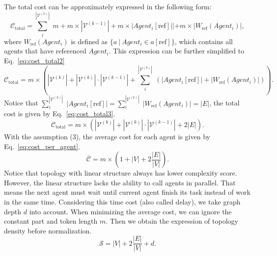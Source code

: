 \documentclass{article}
\theoremstyle{definition}
\begin{document}
The total cost can be approximately expressed in the following form:
\begin{equation}\label{eq:cost_total}
\mathcal{C}_{\text{total}} = \sum_{i}^{|\mathcal{V}^{(k)}|} \; m + m \times |\mathcal{V}^{(k-1)}| + m \times |Agent_i[\text{ref}]|| + m \times |W_{\text{ref}}(Agent_i)|,
\end{equation}
where $W_{\text{ref}}(Agent_i)$ is defined as $\{ a\ |\ Agent_i \in a[\text{ref}] \}$, which contains all agents that have referenced $Agent_i$. This expression can be further simplified to Eq.~\ref{eq:cost_total2}
\begin{equation}\label{eq:cost_total2}
\mathcal{C}_{\text{total}} = m \times (|\mathcal{V}^{(k)}| + |\mathcal{V}^{(k)}| \cdot |\mathcal{V}^{(k-1)}| + \sum^{|\mathcal{V}^{(k)}|}_i\;(|Agent_i[\text{ref}]| + |W_{\text{ref}}(Agent_i)|)).
\end{equation}
Notice that \(\sum^{|\mathcal{V}^{(k)}|}_i\;|Agent_i[\text{ref}]| =\sum^{|\mathcal{V}^{(k)}|}_i\;|W_{\text{ref}}(Agent_i)|=|E|\), the total cost is given by Eq.~\ref{eq:cost_total3}.
\begin{equation}\label{eq:cost_total3}
\mathcal{C}_{\text{total}} = m \times (|\mathcal{V}^{(k)}| + |\mathcal{V}^{(k)}| \cdot |\mathcal{V}^{(k-1)}| + 2|E|).
\end{equation}
With the assumption (3), the average cost for each agent is given by Eq.~\ref{eq:cost_per_agent}.
\begin{equation}\label{eq:cost_per_agent}
\mathcal{\bar C} = m \times (1 + |V| + 2\frac{|E|}{|V|}).
\end{equation}
Notice that topology with linear structure always has lower complexity score. However, the linear structure lacks the ability to call agents in parallel. That means the next agent must wait until current agent finish its task instead of work in the same time. Considering this time cost (also called delay), we take graph depth $d$ into account. When minimizing the average cost, we can ignore the constant part and token length $m$. Then we obtain the expression of topology density before normalization.
\begin{equation}\label{eq:topo_density_tmp}
\mathcal{S} = |V| + 2\frac{|E|}{|V|} + d.
\end{equation}
\end{document}

